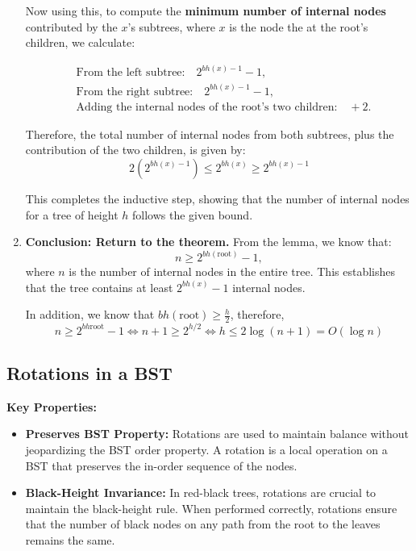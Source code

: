\begin{derivation}
\begin{enumerate}
        \vspace{1em}
        
        Now using this, to compute the \textbf{minimum number of internal nodes} contributed by the \( x \)'s subtrees, where $x$ is the node the at the root's children, we calculate:


        \begin{align*}
            & \text{From the left subtree:} \quad 2^{bh(x)-1} - 1, \\
            & \text{From the right subtree:} \quad 2^{bh(x)-1} - 1, \\
            & \text{Adding the internal nodes of the root's two children:} \quad + 2.
        \end{align*}
        
        Therefore, the total number of internal nodes from both subtrees, plus the contribution of the two children, is given by:
        \[
        2(2^{bh(x)-1}) \leq 2^{bh(x)} \geq 2^{bh(x)-1}
        \]
        \vspace{1em}

        This completes the inductive step, showing that the number of internal nodes for a tree of height \( h \) follows the given bound.
        \vspace{1em}

        \item \textbf{Conclusion: Return to the theorem.} 
        From the lemma, we know that:
        \[
        n \geq 2^{bh(\text{root})} - 1,
        \]
        where \( n \) is the number of internal nodes in the entire tree. This establishes that the tree contains at least \( 2^{bh(x)} - 1 \) internal nodes.
        \vspace{1em}

        In addition, we know that $bh(\text{root}) \geq \frac{h}{2}$, therefore,
        \begin{equation*}
            n \geq 2^{bh{\text{root}}} - 1 \iff n + 1 \geq 2^{h/2} \iff h \leq 2 \log(n+1) = O(\log n) 
        \end{equation*}
    \end{enumerate}
\end{derivation}

\subsection{Rotations in a BST}
\begin{intuition}
    \textbf{Key Properties:}
    \begin{itemize}
        \item \textbf{Preserves BST Property:} Rotations are used to maintain balance without jeopardizing the BST order property. A rotation is a local operation on a BST that preserves the in-order sequence of the nodes.
        \item \textbf{Black-Height Invariance:} In red-black trees, rotations are crucial to maintain the black-height rule. When performed correctly, rotations ensure that the number of black nodes on any path from the root to the leaves remains the same.
    \end{itemize}
\end{intuition}


